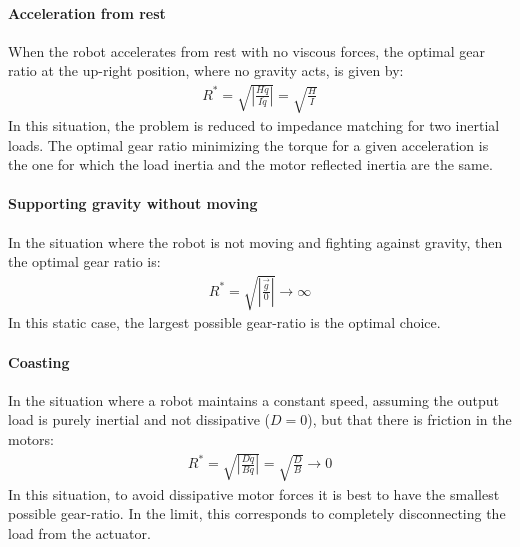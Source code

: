 \paragraph{Acceleration from rest} 

When the robot accelerates from rest with no viscous forces, the optimal gear ratio at the up-right position, where no gravity acts, is given by:
\begin{align}
	R^{*}  = \sqrt{ \left | \frac{H \ddot{q} }{ I \ddot{q} } \right |   } = \sqrt{ \frac{H}{I}}
 \label{eq:impmatchinginertia}
\end{align}
In this situation, the problem is reduced to impedance matching for two inertial loads. The optimal gear ratio minimizing the torque for a given acceleration is the one for which the load inertia and the motor reflected inertia are the same.

\paragraph{Supporting gravity without moving}

In the situation where the robot is not moving and fighting against gravity, then the optimal gear ratio is:
\begin{align}
	R^{*}  = \sqrt{ \left | \frac{ \vec{g} }{ 0 } \right |   } \rightarrow \infty
 \label{eq:gravrejection}
\end{align}
In this static case, the largest possible gear-ratio is the optimal choice. 


\paragraph{Coasting} 

In the situation where a robot maintains a constant speed, assuming the output load is purely inertial and not dissipative ($D=0$), but that there is friction in the motors:
%
\begin{align}
	R^{*}  = \sqrt{ \left | \frac{D \dot{q} }{ B \dot{q} } \right |   } = \sqrt{ \frac{D}{B}} \rightarrow 0
 \label{eq:coastingex}
\end{align}
%
In this situation, to avoid dissipative motor forces it is best to have the smallest possible gear-ratio. In the limit, this corresponds to completely disconnecting the load from the actuator.



